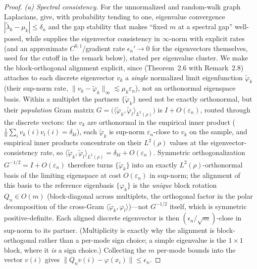 \documentclass[review,supplement]{siamart220329}
\begin{document}
\begin{proof}
\emph{(a) Spectral consistency.} For the unnormalized and random-walk graph
Laplacians, \cite{calder2022} give, with probability tending to one, eigenvalue
convergence $|\tilde\lambda_k-\mu_k|\le\delta_n$ and the gap stability that makes
``fixed $m$ at a spectral gap'' well-posed, while \cite{calderlewicka2022}
supplies the eigenvector consistency in $\infty$-norm with explicit rates (and an
approximate $C^{0,1}$/gradient rate $\epsilon_n'\to0$ for the eigenvectors
themselves, used for the cutoff in the remark below), stated per eigenvalue
cluster. We make the block-orthogonal alignment explicit, since
\cite{calderlewicka2022} (Theorem~2.6 with Remark~2.8) attaches to each discrete
eigenvector $v_k$ a
\emph{single} normalized limit eigenfunction $\tilde\varphi_k$ (their sup-norm
rate, $\lVert v_k-\tilde\varphi_k\rVert_\infty\lesssim\mu_k\varepsilon_n$), not an
orthonormal eigenspace basis. Within a multiplet the partners
$\{\tilde\varphi_k\}$ need not be exactly orthonormal, but their \emph{population}
Gram matrix $G=\big(\langle\tilde\varphi_k,\tilde\varphi_l\rangle_{L^2(\rho)}\big)$
is $I+O(\varepsilon_n)$, routed through the discrete vectors: the $v_k$ are
orthonormal in the empirical inner product ($\tfrac1n\sum_i v_k(i)v_l(i)=\delta_{kl}$),
each $\tilde\varphi_k$ is sup-norm $\varepsilon_n$-close to $v_k$ on the sample, and
empirical inner products concentrate on their $L^2(\rho)$ values at the
eigenvector-consistency rate, so
$\langle\tilde\varphi_k,\tilde\varphi_l\rangle_{L^2(\rho)}=\delta_{kl}+O(\varepsilon_n)$. Symmetric orthogonalization
$G^{-1/2}=I+O(\varepsilon_n)$ therefore turns $\{\tilde\varphi_k\}$ into an exactly
$L^2(\rho)$-orthonormal basis of the limiting eigenspace at cost $O(\varepsilon_n)$
in sup-norm; the alignment of this basis to the reference eigenbasis
$\{\varphi_k\}$ is the \emph{unique} block rotation $Q_n\in O(m)$ (block-diagonal
across multiplets, the orthogonal factor in the polar decomposition of the
cross-Gram $\langle\tilde\varphi_k,\varphi_l\rangle$)---not $G^{-1/2}$ itself, which
is symmetric positive-definite. Each aligned discrete eigenvector is then
$(\epsilon_n/\sqrt m)$-close in sup-norm to its partner. (Multiplicity is exactly why the alignment is block-orthogonal rather
than a per-mode sign choice; a simple eigenvalue is the $1\times1$ block, where it
\emph{is} a sign choice.) Collecting the $m$ per-mode bounds into the vector $v(i)$
gives $\lVert Q_nv(i)-\varphi(x_i)\rVert\le\epsilon_n$.


\end{proof}
\end{document}
